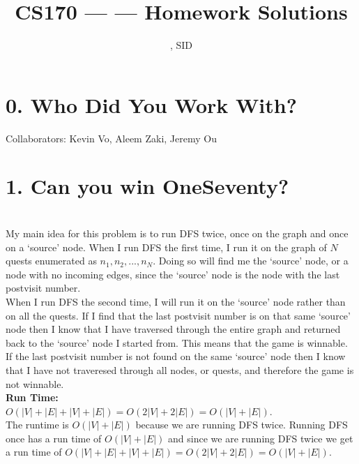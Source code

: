 \documentclass[11pt]{article}
\title{CS170 --- \Session --- Homework \Homework \space Solutions}
\author{\Name, SID \SID}
\date{}
\newenvironment{mainIdea}{{\bf Main Idea:}}{\smallskip}
\newenvironment{runTime}{{\bf Run Time:}}{\smallskip}
\begin{document}
\maketitle

\section*{0. Who Did You Work With?}

Collaborators: Kevin Vo, Aleem Zaki, Jeremy Ou



\newpage
\section*{1. Can you win OneSeventy?}
\vspace*{1\baselineskip}
\begin{mainIdea}
\vspace*{1\baselineskip}
\\
My main idea for this problem is to run DFS twice, once on the graph and once on a `source' node. When I run DFS the first time, I run it on the graph of $N$ quests enumerated as ${n_1, n_2, ..., n_N}$. Doing so will find me the `source' node, or a node with no incoming edges, since the `source' node is the node with the last postvisit number.
\\
When I run DFS the second time, I will run it on the `source' node rather than on all the quests. If I find that the last postvisit number is on that same `source' node then I know that I have traversed through the entire graph and returned back to the `source' node I started from. This means that the game is winnable. If the last postvisit number is not found on the same `source' node then I know that I have not traveresed through all nodes, or quests, and therefore the game is not winnable.
\end{mainIdea}
\vspace*{1\baselineskip}
\\
\begin{runTime}
\vspace*{1\baselineskip}
\\
$O(|V| + |E| + |V| + |E|) = O(2|V| + 2|E|) = O(|V| + |E|)$.
\vspace*{1\baselineskip}
\\
The runtime is $O(|V| + |E|)$ because we are running DFS twice. Running DFS once has a run time of $O(|V| + |E|)$ and since we are running DFS twice we get a run time of $O(|V| + |E| + |V| + |E|) = O(2|V| + 2|E|) = O(|V| + |E|)$.
\end{runTime}
\end{document}
